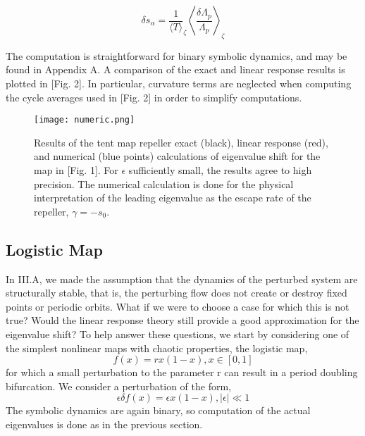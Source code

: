 \documentclass[pre,aps,twocolumn,showpacs,hyperref]{revtex4-1} %
\begin{document}
\begin{equation}
\delta s_{\alpha} = \frac{1}{\langle T \rangle}_{\zeta} \left\langle \frac{\delta \Lambda_{p}}{\Lambda_{p}} \right\rangle_{\zeta}
\end{equation}

The computation is straightforward for binary symbolic dynamics, and may be found in Appendix A. A comparison of the exact and linear response results is plotted in [Fig. 2]. In particular, curvature terms are neglected when computing the cycle averages used in [Fig. 2] in order to simplify computations.


\begin{figure}[t]
\begin{centering}
\texttt{[image: numeric.png]}

\caption{Results of the tent map repeller exact (black), linear response (red), and numerical (blue points) calculations of eigenvalue shift for the map in [Fig. 1]. For $\epsilon$ sufficiently small, the results agree to high precision. The numerical calculation is done for the physical interpretation of the leading eigenvalue as the escape rate of the repeller, $\gamma = -s_{0}$.}

\end{centering}
\end{figure}
\subsection{Logistic Map}
In III.A, we made the assumption that the dynamics of the perturbed system are structurally stable, that is, the perturbing flow does not create or destroy fixed points or periodic orbits. What if we were to choose a case for which this is not true? Would the linear response theory still provide a good approximation for the eigenvalue shift? To help answer these questions, we start by considering one of the simplest nonlinear maps with chaotic properties, the logistic map,
\begin{equation}
f(x) = rx(1 - x), x\in [0, 1]
\end{equation}
for which a small perturbation to the parameter r can result in a period doubling bifurcation. We consider a perturbation of the form,
\begin{equation}
\epsilon \delta f(x) = \epsilon x(1-x), \mid \epsilon \mid \ll 1
\end{equation}
The symbolic dynamics are again binary, so computation of the actual eigenvalues is done as in the previous section.
\end{document}
